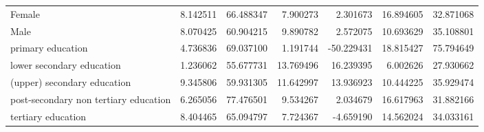 \documentclass{article}
\begin{document}
\begin{table}[!htbp]
\begin{center}
{\begin{tabular}{lrrrrrr}
Female                                &   8.142511 &  66.488347 &   7.900273 &   2.301673 &  16.894605 &  32.871068 \\
Male                                  &   8.070425 &  60.904215 &   9.890782 &   2.572075 &  10.693629 &  35.108801 \\
primary education                     &   4.736836 &  69.037100 &   1.191744 & -50.229431 &  18.815427 &  75.794649 \\
lower secondary education             &   1.236062 &  55.677731 &  13.769496 &  16.239395 &   6.002626 &  27.930662 \\
(upper) secondary education           &   9.345806 &  59.931305 &  11.642997 &  13.936923 &  10.444225 &  35.929474 \\
post-secondary non tertiary education &   6.265056 &  77.476501 &   9.534267 &   2.034679 &  16.617963 &  31.882166 \\
tertiary education                    &   8.404465 &  65.094797 &   7.724367 &  -4.659190 &  14.562024 &  34.033161 \\
\bottomrule
\end{tabular}

}
\end{center}
\end{table}
\end{document}
